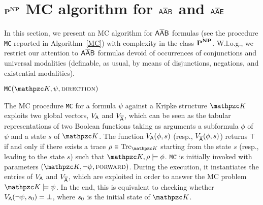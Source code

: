 \section{$\textbf{P}^{\textbf{NP}}$ MC algorithm for $\mathsf{A\overline{A}B}$ and $\mathsf{A\overline{A}E}$}\label{sec:AAbarBalgo}
In this section, we present an MC algorithm for $\mathsf{A\overline{A}B}$ formulas (see the procedure \texttt{MC} reported in Algorithm~\ref{MC}) with 
complexity in the class $\textbf{P}^{\textbf{NP}}$. 
W.l.o.g., we restrict our attention to $\mathsf{A\overline{A}B}$ formulas devoid of occurrences of conjunctions and universal modalities 
(definable, as usual, by means of disjunctions, negations, and existential modalities).

\begin{algorithm}[b]
\begin{algorithmic}[1]
	\EndFor
	\EndFor
	
		\EndIf
	\EndFor
\end{algorithmic}
\caption{\texttt{MC}$(\Ku,\psi,\textsc{direction})$}\label{MC}
\end{algorithm}

The MC procedure \texttt{MC} for a formula $\psi$ against a Kripke structure $\Ku$ exploits two global vectors, $V_{\mathsf{A}}$ and $V_{\mathsf{\overline{A}}}$, which can be seen as the tabular representations of two Boolean functions taking as arguments a subformula $\phi$ of $\psi$ and a state $s$ of $\Ku$. 
The function $V_{\mathsf{A}} (\phi,s)$ (resp., $V_{\mathsf{\overline{A}}}(\phi,s)$) returns $\top$ if and only if there exists a 
trace $\rho \in \Trk_{\Ku}$ starting from the state $s$ (resp., leading to the state $s$) such that $\Ku, \rho \models \phi$. 
%
$\texttt{MC}$ is initially invoked with parameters $(\Ku,\neg\psi,\textsc{forward})$. During the execution, it instantiates the entries of
$V_{\mathsf{A}}$ and $V_{\mathsf{\overline{A}}}$, which are exploited in order to answer the MC problem $\Ku\models \psi$. In the end, this is equivalent to checking whether $V_{\mathsf{A}}(\neg\psi,s_0)=\bot$, where $s_0$ is the initial state of $\Ku$.

